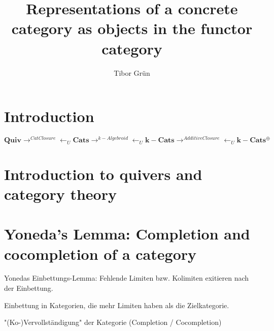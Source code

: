 \documentclass{article}
\title{Representations of a concrete category as objects in the functor category}
\author{Tibor Gr{\"u}n}
\theoremstyle{definition}
\begin{document}

	\maketitle

	\newpage

	\tableofcontents

	\newpage


%

\section{Introduction}

\[
\mathbf{Quiv}\rightarrow^{CatClosure}\leftarrow_{U}\mathbf{Cats}
\rightarrow^{k-Algebroid}\leftarrow_{U}\mathbf{k-Cats}
\rightarrow^{AdditiveClosure}\leftarrow_{U}\mathbf{k-Cats^{\oplus}}
\]



\section{Introduction to quivers and category theory}






%

%

\section{Yoneda's Lemma: Completion and cocompletion of a category}




%



Yonedas Einbettungs-Lemma: Fehlende Limiten bzw. Kolimiten exitieren nach der Einbettung.

Einbettung in Kategorien, die mehr Limiten haben als die Zielkategorie.

"(Ko-)Vervollständigung" der Kategorie (Completion / Cocompletion)
\end{document}
